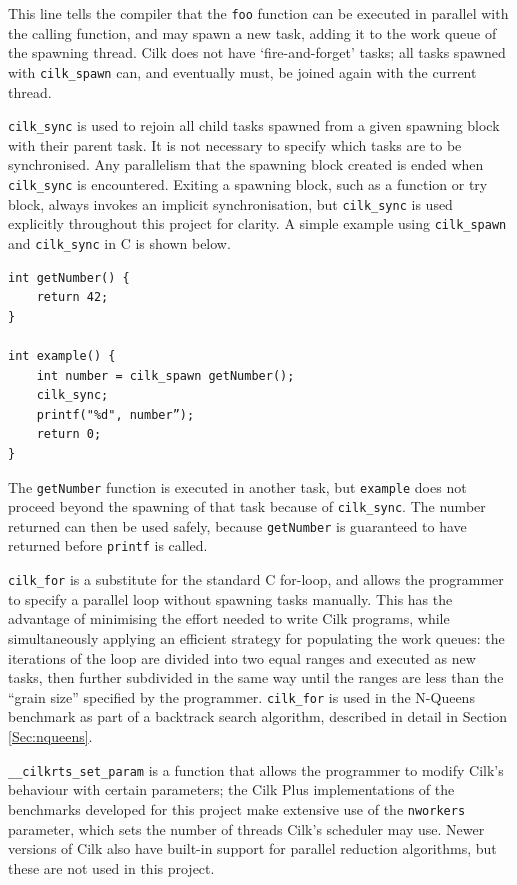 \documentclass{report}
\newenvironment{mono}{\fontfamily{ttfamily}\selectfont}{\par}
\newenvironment{embedcode}{\begin{changemargin}{6em}{3em}\begin{mono}{}}{\end{mono}\end{changemargin}}
\begin{document}
This line tells the compiler that the \verb!foo! function can be executed in parallel with the calling function, and may spawn a new task, adding it to the work queue of the spawning thread\cite{Jeffers13}. Cilk does not have `fire-and-forget' tasks; all tasks spawned with \verb!cilk_spawn! can, and eventually must, be joined again with the current thread\cite{Jeffers13}.

\verb!cilk_sync! is used to rejoin all child tasks spawned from a given spawning block with their parent task\cite{Jeffers13}. It is not necessary to specify which tasks are to be synchronised. Any parallelism that the spawning block created is ended when \verb!cilk_sync! is encountered. Exiting a spawning block, such as a function or try block, always invokes an implicit synchronisation, but \verb!cilk_sync! is used explicitly throughout this project for clarity. A simple example using \verb!cilk_spawn! and \verb!cilk_sync! in C is shown below.

\begin{embedcode}
\begin{verbatim}
int getNumber() {
    return 42;
}

int example() {
    int number = cilk_spawn getNumber();
    cilk_sync;
    printf("%d", number”);
    return 0;
}
\end{verbatim}
\end{embedcode}

The \verb!getNumber! function is executed in another task, but \verb!example! does not proceed beyond the spawning of that task because of \verb!cilk_sync!. The number returned can then be used safely, because \verb!getNumber! is guaranteed to have returned before \verb!printf! is called.

\verb!cilk_for! is a substitute for the standard C for-loop, and allows the programmer to specify a parallel loop without spawning tasks manually. This has the advantage of minimising the effort needed to write Cilk programs, while simultaneously applying an efficient strategy for populating the work queues: the iterations of the loop are divided into two equal ranges and executed as new tasks, then further subdivided in the same way until the ranges are less than the “grain size” specified by the programmer\cite{cilkplussite}. \verb!cilk_for! is used in the N-Queens benchmark as part of a backtrack search algorithm, described in detail in Section \ref{Sec:nqueens}.

\verb!__cilkrts_set_param! is a function that allows the programmer to modify Cilk's behaviour with certain parameters; the Cilk Plus implementations of the benchmarks developed for this project make extensive use of the \verb!nworkers! parameter, which sets the number of threads Cilk's scheduler may use. Newer versions of Cilk also have built-in support for parallel reduction algorithms, but these are not used in this project.
\end{document}
